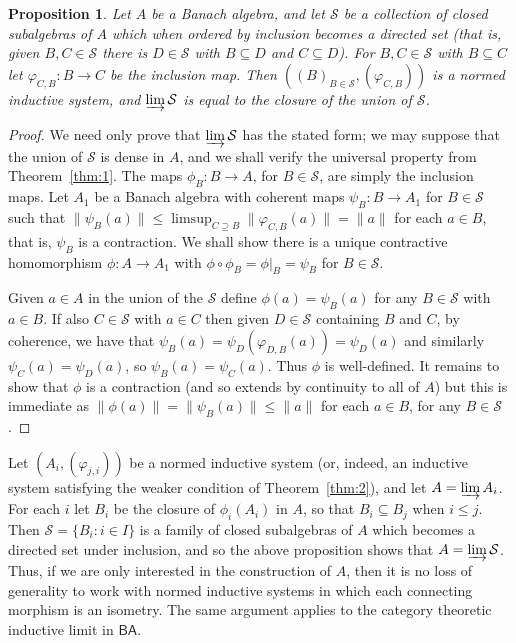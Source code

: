 \documentclass[a4paper,11pt]{article}
\newcommand{\mc}[1]{{\mathcal{#1}}}
\newcommand{\indlim}{\varinjlim}
\newcommand{\ba}{\textsf{BA}}
\newtheorem{proposition}[lemma]{Proposition}
\theoremstyle{definition}
\begin{document}
\begin{proposition}
Let $A$ be a Banach algebra, and let $\mc S$ be a collection of closed subalgebras of $A$ which
when ordered by inclusion becomes a directed set (that is, given $B,C\in\mc S$ there is $D\in\mc S$
with $B\subseteq D$ and $C\subseteq D$).  For $B,C\in\mc S$ with $B\subseteq C$ let $\varphi_{C,B}:
B\rightarrow C$ be the inclusion map.  Then $((B)_{B\in\mc S}, (\varphi_{C,B}))$ is a normed
inductive system, and $\indlim \mc S$ is equal to the closure of the union of $\mc S$.
\end{proposition}
\begin{proof}
We need only prove that $\indlim\mc S$ has the stated form; we may suppose that the union of $\mc S$
is dense in $A$, and we shall verify the universal property from Theorem~\ref{thm:1}.  The maps
$\phi_B:B\rightarrow A$, for $B\in\mc S$, are simply the inclusion maps.  Let $A_1$
be a Banach algebra with coherent maps $\psi_B:B\rightarrow A_1$ for $B\in\mc S$ such that
$\|\psi_B(a)\| \leq \limsup_{C\supseteq B} \|\varphi_{C,B}(a)\| = \|a\|$ for each $a\in B$, that is,
$\psi_B$ is a contraction.  We shall show there is a unique contractive homomorphism $\phi:A
\rightarrow A_1$ with $\phi \circ \phi_B = \phi|_B = \psi_B$ for $B\in\mc S$.

Given $a\in A$ in the union of the $\mc S$ define $\phi(a) = \psi_B(a)$ for any $B\in\mc S$ with
$a\in B$.  If also $C\in\mc S$ with $a\in C$ then given $D\in\mc S$ containing $B$ and $C$, by
coherence, we have that $\psi_B(a) = \psi_D(\varphi_{D,B}(a)) = \psi_D(a)$ and similarly
$\psi_C(a) = \psi_D(a)$, so $\psi_B(a) = \psi_C(a)$.  Thus $\phi$ is well-defined.  It remains to
show that $\phi$ is a contraction (and so extends by continuity to all of $A$) but this is
immediate as $\|\phi(a)\| = \|\psi_B(a)\| \leq \|a\|$ for each $a\in B$, for any $B\in\mc S$.
\end{proof}

Let $(A_i, (\varphi_{j,i}))$ be a normed inductive system (or, indeed, an inductive system
satisfying the weaker condition of Theorem~\ref{thm:2}), and let $A = \indlim A_i$.  For each $i$
let $B_i$ be the closure of $\phi_i(A_i)$ in $A$, so that $B_i \subseteq B_j$ when $i\leq j$.
Then $\mc S = \{ B_i : i\in I \}$ is a family of closed subalgebras of $A$ which becomes a directed
set under inclusion, and so the above proposition shows that $A = \indlim \mc S$.  Thus, if we are
only interested in the construction of $A$, then it is no loss of generality to work with normed
inductive systems in which each connecting morphism is an isometry.  The same argument applies to
the category theoretic inductive limit in $\ba$.
\end{document}
